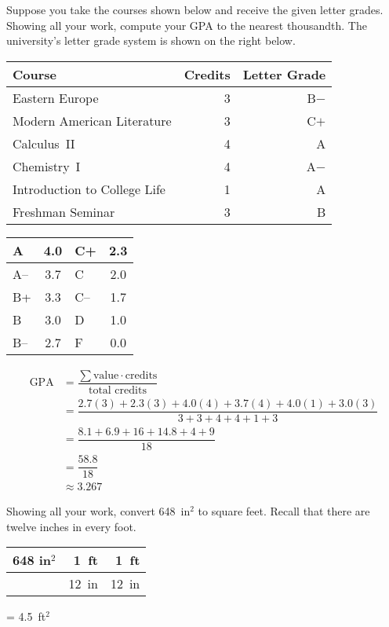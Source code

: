 \documentclass[12pt,letterpaper]{exam}
\begin{document}
\begin{questions}
\newpage
\question[10] Suppose you take the courses shown below and receive the given letter grades. Showing all your work, compute your GPA to the nearest thousandth. The university's letter grade system is shown on the right below. \par
	\begin{table}[!ht]
	\centering
	\begin{tabular}{lrr}
	Course & Credits & Letter Grade \\ \hline
	Eastern Europe & 3 & B$-$ \\
	Modern American Literature & 3 & C$+$ \\
	Calculus~II & 4 & A\phantom{$-$} \\
	Chemistry~I & 4 & A$-$ \\
	Introduction to College Life & 1 & A\phantom{$-$} \\
	Freshman Seminar & 3 & B\phantom{$-$}
	\end{tabular} \hspace{1cm}
        \begin{tabular}{|l||c|l||c|} \hline
        A & 4.0 & C+ & 2.3 \\ \hline
        A-- & 3.7 & C & 2.0 \\ \hline
        B+ & 3.3 & C-- & 1.7 \\ \hline
        B & 3.0 & D & 1.0 \\ \hline
        B-- & 2.7 & F & 0.0 \\ \hline
        \end{tabular}
	\end{table} \pspace

	\[
	\begin{aligned}
	\text{GPA}&= \dfrac{\sum \text{value} \cdot \text{credits}}{\text{total credits}} \\[0.3cm]
	&= \dfrac{2.7(3) + 2.3(3) + 4.0(4) + 3.7(4) + 4.0(1) + 3.0(3)}{3 + 3 + 4 + 4 + 1 + 3} \\[0.3cm]
	&= \dfrac{8.1 + 6.9 + 16 + 14.8 + 4 + 9}{18} \\[0.3cm]
	&= \dfrac{58.8}{18} \\[0.3cm]
	&\approx 3.267
	\end{aligned}
	\]



\newpage
\question[10] Showing all your work, convert 648~in$^2$ to square feet. Recall that there are twelve inches in every foot. \pspace

	\begin{table}[!ht]
	\centering
	\begin{tabular}{r|r|r}
	648 in$^2$ & 1~ft & 1~ft \\ \hline
			& 12~in & 12~in
	\end{tabular}
	= 4.5~ft$^2$
	\end{table}




\end{questions}
\end{document}
